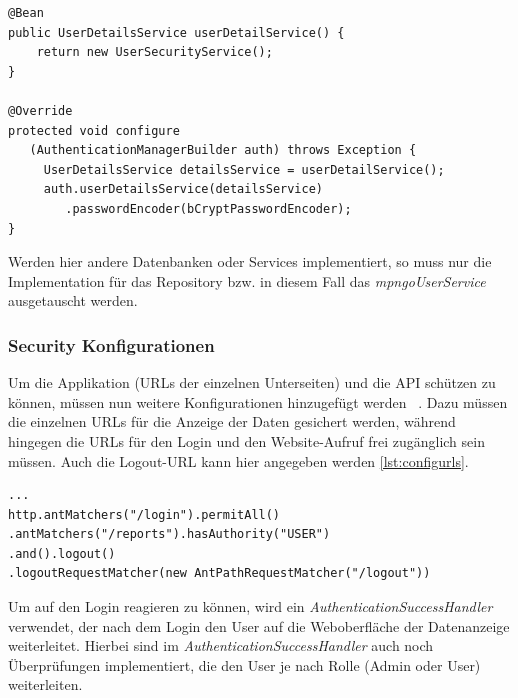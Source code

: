 \begin{samepage}%
	\begin{lstlisting}[float=tbhp]
@Bean
public UserDetailsService userDetailService() {
    return new UserSecurityService();
}

@Override
protected void configure
   (AuthenticationManagerBuilder auth) throws Exception {
     UserDetailsService detailsService = userDetailService();
     auth.userDetailsService(detailsService)
        .passwordEncoder(bCryptPasswordEncoder);
}
	\end{lstlisting}
\end{samepage}
Werden hier andere Datenbanken oder Services implementiert, so muss nur die Implementation für das Repository bzw. in diesem Fall das \textit{mpngoUserService} ausgetauscht werden. 
\subsubsection{Security Konfigurationen}
Um die Applikation (URLs der einzelnen Unterseiten) und die API schützen zu können, müssen nun weitere Konfigurationen hinzugefügt werden ~\parencite{springSecBook}. Dazu müssen die einzelnen URLs für die Anzeige der Daten gesichert werden, während hingegen die URLs für den Login und den Website-Aufruf frei zugänglich sein müssen. Auch die Logout-URL kann hier angegeben werden \ref{lst:configurls}.
\lstset{
  caption=[Konfiguration für die Sicherheit der URLs.]{Konfiguration für die Sicherheit der URLs. Die einzelnen Paths können entweder für alle freigegeben oder für eine bestimmte Gruppe angezeigt werden. Das Abmelden wird von Spring automatisch durchgeführt.}, 
  basicstyle=\small\ttfamily, 
  label=lst:configurls, 
  language=Java,
  frame=single,
  breaklines=true, %
  postbreak=\mbox{\textcolor{red}{$\hookrightarrow$}\space},
}

\begin{samepage}%
	\begin{lstlisting}[float=tbhp]
...
http.antMatchers("/login").permitAll()
.antMatchers("/reports").hasAuthority("USER")
.and().logout()
.logoutRequestMatcher(new AntPathRequestMatcher("/logout"))
\end{lstlisting}
\end{samepage}
Um auf den Login reagieren zu können, wird ein \textit{AuthenticationSuccessHandler} verwendet, der nach dem Login den User auf die Weboberfläche der Datenanzeige weiterleitet. Hierbei sind im \textit{AuthenticationSuccessHandler} auch noch Überprüfungen implementiert, die den User je nach Rolle (Admin oder User) weiterleiten. 
